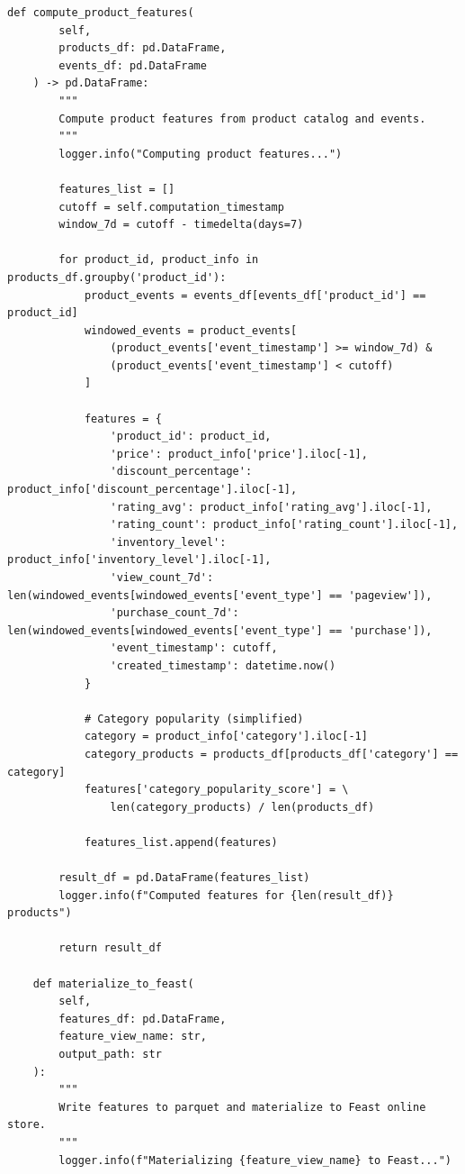 \begin{lstlisting}[style=python, caption=Production feature materialization pipeline]
    def compute_product_features(
        self,
        products_df: pd.DataFrame,
        events_df: pd.DataFrame
    ) -> pd.DataFrame:
        """
        Compute product features from product catalog and events.
        """
        logger.info("Computing product features...")

        features_list = []
        cutoff = self.computation_timestamp
        window_7d = cutoff - timedelta(days=7)

        for product_id, product_info in products_df.groupby('product_id'):
            product_events = events_df[events_df['product_id'] == product_id]
            windowed_events = product_events[
                (product_events['event_timestamp'] >= window_7d) &
                (product_events['event_timestamp'] < cutoff)
            ]

            features = {
                'product_id': product_id,
                'price': product_info['price'].iloc[-1],
                'discount_percentage': product_info['discount_percentage'].iloc[-1],
                'rating_avg': product_info['rating_avg'].iloc[-1],
                'rating_count': product_info['rating_count'].iloc[-1],
                'inventory_level': product_info['inventory_level'].iloc[-1],
                'view_count_7d': len(windowed_events[windowed_events['event_type'] == 'pageview']),
                'purchase_count_7d': len(windowed_events[windowed_events['event_type'] == 'purchase']),
                'event_timestamp': cutoff,
                'created_timestamp': datetime.now()
            }

            # Category popularity (simplified)
            category = product_info['category'].iloc[-1]
            category_products = products_df[products_df['category'] == category]
            features['category_popularity_score'] = \
                len(category_products) / len(products_df)

            features_list.append(features)

        result_df = pd.DataFrame(features_list)
        logger.info(f"Computed features for {len(result_df)} products")

        return result_df

    def materialize_to_feast(
        self,
        features_df: pd.DataFrame,
        feature_view_name: str,
        output_path: str
    ):
        """
        Write features to parquet and materialize to Feast online store.
        """
        logger.info(f"Materializing {feature_view_name} to Feast...")


\end{lstlisting}
